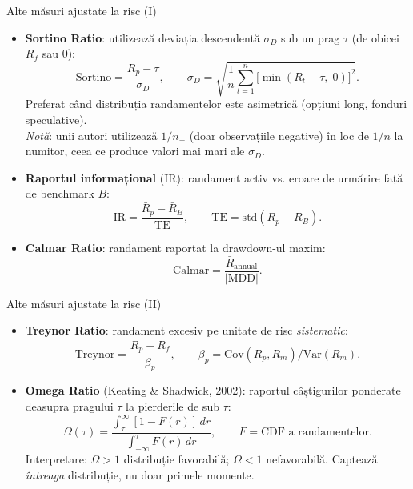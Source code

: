 \documentclass[9pt, aspectratio=169, t]{beamer}
\theoremstyle{definition}
\newcommand{\Var}{\text{Var}}
\newcommand{\Cov}{\text{Cov}}
\begin{document}
\begin{frame}{Alte măsuri ajustate la risc (I)}
\begin{itemize}
    \item \textbf{Sortino Ratio}: utilizează deviația descendentă $\sigma_D$ sub un prag $\tau$ (de obicei $R_f$ sau 0):
    \[
    \text{Sortino} = \frac{\bar{R}_p - \tau}{\sigma_D}, \qquad \sigma_D = \sqrt{\frac{1}{n}\sum_{t=1}^{n}\bigl[\min(R_t - \tau,\;0)\bigr]^2}.
    \]
    Preferat când distribuția randamentelor este asimetrică (opțiuni long, fonduri speculative).\\
    {\footnotesize\textit{Notă}: unii autori utilizează $1/n_-$ (doar observațiile negative) în loc de $1/n$ la numitor, ceea ce produce valori mai mari ale $\sigma_D$.}
    \item \textbf{Raportul informațional} (IR): randament activ vs. eroare de urmărire față de benchmark $B$:
    \[
    \text{IR} = \frac{\bar{R}_p - \bar{R}_B}{\text{TE}}, \qquad \text{TE} = \text{std}(R_p - R_B).
    \]
    \item \textbf{Calmar Ratio}: randament raportat la drawdown-ul maxim:
    \[
    \text{Calmar} = \frac{\bar{R}_{\text{annual}}}{|\text{MDD}|}.
    \]
\end{itemize}
\end{frame}

\begin{frame}{Alte măsuri ajustate la risc (II)}
\begin{itemize}
    \item \textbf{Treynor Ratio}: randament excesiv pe unitate de risc \textit{sistematic}:
    \[
    \text{Treynor} = \frac{\bar{R}_p - R_f}{\beta_p}, \qquad \beta_p = \Cov(R_p, R_m)/\Var(R_m).
    \]
    \item \textbf{Omega Ratio} (Keating \& Shadwick, 2002): raportul câștigurilor ponderate deasupra pragului $\tau$ la pierderile de sub $\tau$:
    \[
    \Omega(\tau) = \frac{\int_{\tau}^{\infty}[1 - F(r)]\,dr}{\int_{-\infty}^{\tau}F(r)\,dr}, \qquad F = \text{CDF a randamentelor}.
    \]
    Interpretare: $\Omega > 1$ distribuție favorabilă; $\Omega < 1$ nefavorabilă. Captează \textit{întreaga} distribuție, nu doar primele momente.
\end{itemize}
\end{frame}
\end{document}
